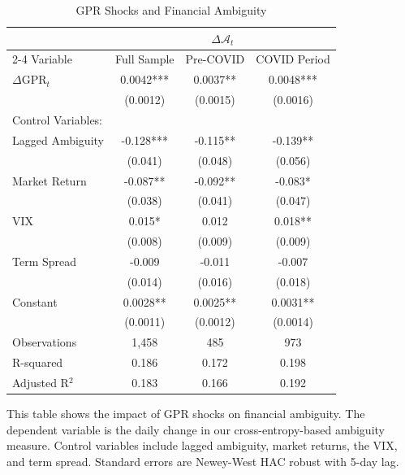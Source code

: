 \documentclass[preprint,12pt,authoryear]{elsarticle}
\begin{document}
\begin{table}[htbp]
\centering
\caption{GPR Shocks and Financial Ambiguity}
\label{tab:gpr_ambiguity}
\begin{threeparttable}
\begin{tabular*}{\textwidth}{@{\extracolsep{\fill}} lccc @{\extracolsep{\fill}}}
\toprule
& \multicolumn{3}{c}{$\Delta \mathcal{A}_{t}$} \\
\cmidrule(lr){2-4}
Variable & Full Sample & Pre-COVID & COVID Period \\
\midrule
\midrule
$\Delta$GPR$_t$ & 0.0042*** & 0.0037** & 0.0048*** \\
& (0.0012) & (0.0015) & (0.0016) \\
\midrule
Control Variables: & & & \\
Lagged Ambiguity & -0.128*** & -0.115** & -0.139** \\
& (0.041) & (0.048) & (0.056) \\
Market Return & -0.087** & -0.092** & -0.083* \\
& (0.038) & (0.041) & (0.047) \\
VIX & 0.015* & 0.012 & 0.018** \\
& (0.008) & (0.009) & (0.009) \\
Term Spread & -0.009 & -0.011 & -0.007 \\
& (0.014) & (0.016) & (0.018) \\
\midrule
Constant & 0.0028** & 0.0025** & 0.0031** \\
& (0.0011) & (0.0012) & (0.0014) \\
\midrule
Observations & 1,458 & 485 & 973 \\
R-squared & 0.186 & 0.172 & 0.198 \\
Adjusted R$^2$ & 0.183 & 0.166 & 0.192 \\
\bottomrule
\end{tabular*}
\begin{tablenotes}[flushleft]
\small
\item[] This table shows the impact of GPR shocks on financial ambiguity. The dependent variable is the daily change in our cross-entropy-based ambiguity measure. Control variables include lagged ambiguity, market returns, the VIX, and term spread. Standard errors are Newey-West HAC robust with 5-day lag.
\end{tablenotes}
\end{threeparttable}
\end{table}
\end{document}
